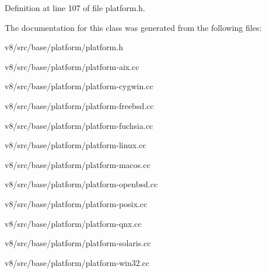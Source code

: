 Definition at line 107 of file platform.\+h.



The documentation for this class was generated from the following files\+:\begin{DoxyCompactItemize}
\item 
v8/src/base/platform/platform.\+h\item 
v8/src/base/platform/platform-\/aix.\+cc\item 
v8/src/base/platform/platform-\/cygwin.\+cc\item 
v8/src/base/platform/platform-\/freebsd.\+cc\item 
v8/src/base/platform/platform-\/fuchsia.\+cc\item 
v8/src/base/platform/platform-\/linux.\+cc\item 
v8/src/base/platform/platform-\/macos.\+cc\item 
v8/src/base/platform/platform-\/openbsd.\+cc\item 
v8/src/base/platform/platform-\/posix.\+cc\item 
v8/src/base/platform/platform-\/qnx.\+cc\item 
v8/src/base/platform/platform-\/solaris.\+cc\item 
v8/src/base/platform/platform-\/win32.\+cc\end{DoxyCompactItemize}
